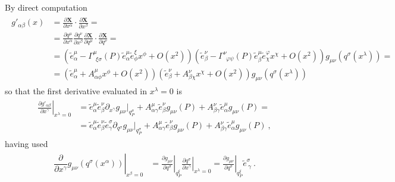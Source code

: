 \documentclass[letterpaper,10pt,english]{jupyterBook}
\begin{document}
\sphinxAtStartPar
By direct computation
\begin{equation*}
\begin{split}\begin{aligned}
  g'_{\alpha \beta}(x)
  & = \frac{\partial \mathbf{X}}{\partial x^\alpha} \cdot \frac{\partial \mathbf{X}}{\partial x^{\beta}} = \\
  & = \frac{\partial q^{\mu}}{\partial x^\alpha} \frac{\partial q^{\nu}}{\partial x^\beta} \frac{\partial \mathbf{X}}{\partial q^{\mu}} \cdot \frac{\partial \mathbf{X}}{\partial q^{\nu}} = \\
  & = \left( \widetilde{e}^{\mu}_\alpha - \Gamma^{\mu}_{\ \ \xi \sigma}(P) \widetilde{e}^{\mu}_{\alpha} \widetilde{e}^{\xi}_{\phi} x^\phi + O(x^2) \right) \left( \widetilde{e}^{\nu}_\beta - \Gamma^{\nu}_{\ \ \varphi \psi}(P) \widetilde{e}^{\mu}_{\beta} \widetilde{e}^{\varphi}_{\chi} x^\chi + O(x^2) \right) g_{\mu \nu}(q^\sigma (x^\lambda)) = \\
  & = \left( \widetilde{e}^{\mu}_\alpha + A^{\mu}_{\alpha \phi} x^\phi + O(x^2) \right) \left( \widetilde{e}^{\nu}_\beta +  A^{\nu}_{\beta \chi} x^\chi + O(x^2) \right) g_{\mu \nu}(q^\sigma (x^\lambda))
\end{aligned}\end{split}
\end{equation*}
\sphinxAtStartPar
so that the first derivative evaluated in \(x^\lambda = 0\) is
\begin{equation*}
\begin{split}\begin{aligned}
  \left.\frac{\partial g'_{\alpha \beta}}{\partial x^\gamma}\right|_{x^\lambda = 0} 
  & = \widetilde{e}^{\mu}_{\alpha} \widetilde{e}^{\nu}_{\beta} \partial_{x^\gamma} g_{\mu \nu}|_{q^\sigma_P} + A^{\mu}_{\alpha \gamma} \widetilde{e}^{\nu}_{\beta} g_{\mu \nu}(P) + A^{\nu}_{\beta \gamma} \widetilde{e}^{\mu}_{\alpha} g_{\mu \nu}(P) = \\
  & = \widetilde{e}^{\mu}_{\alpha} \widetilde{e}^{\nu}_{\beta} \widetilde{e}^{\sigma}_{\gamma} \partial_{q^\sigma} g_{\mu \nu}|_{q^\sigma_P} + A^{\mu}_{\alpha \gamma} \widetilde{e}^{\nu}_{\beta} g_{\mu \nu}(P) + A^{\nu}_{\beta \gamma} \widetilde{e}^{\mu}_{\alpha} g_{\mu \nu}(P) \ ,
\end{aligned}\end{split}
\end{equation*}
\sphinxAtStartPar
having used
\begin{equation*}
\begin{split}\begin{aligned}
  \left. \dfrac{\partial}{\partial x^\gamma} g_{\mu \nu}(q^\sigma(x^\alpha)) \right|_{x^\beta = 0}
  & = \left. \frac{\partial g_{\mu \nu}}{\partial q^{\sigma}} \right|_{q^{\xi}_P} \left. \frac{\partial q^\sigma}{\partial x^\gamma}\right|_{x^\lambda=0} 
    = \left. \frac{\partial g_{\mu \nu}}{\partial q^{\sigma}} \right|_{q^{\xi}_P} \widetilde{e}^{\sigma}_{\ \gamma} \ .
\end{aligned}\end{split}
\end{equation*}
\end{document}
